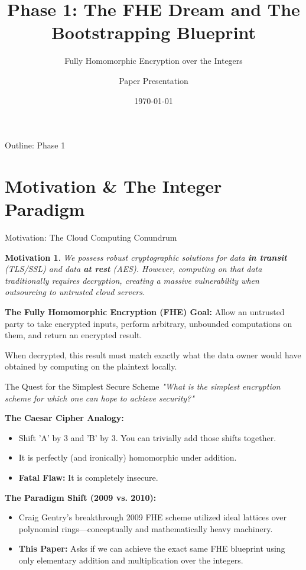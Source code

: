 \documentclass[10pt, aspectratio=169]{beamer}
\title[Phase 1: FHE \& Bootstrapping]{Phase 1: The FHE Dream and The Bootstrapping Blueprint}
\subtitle{Fully Homomorphic Encryption over the Integers}
\author{Paper Presentation}
\date{\today}
\newtheorem{motivation}{Motivation}
\begin{document}
\frame{\titlepage}

\begin{frame}{Outline: Phase 1}
    \tableofcontents
\end{frame}

\section{Motivation \& The Integer Paradigm}

\begin{frame}{Motivation: The Cloud Computing Conundrum}
    \begin{motivation}
    We possess robust cryptographic solutions for data \textbf{in transit} (TLS/SSL) and data \textbf{at rest} (AES). However, computing on that data traditionally requires decryption, creating a massive vulnerability when outsourcing to untrusted cloud servers.
    \end{motivation}
    \pause
    
    \vspace{0.3cm}
    \textbf{The Fully Homomorphic Encryption (FHE) Goal:}
    Allow an untrusted party to take encrypted inputs, perform arbitrary, unbounded computations on them, and return an encrypted result. 
    \pause
    
    \vspace{0.3cm}
    When decrypted, this result must match exactly what the data owner would have obtained by computing on the plaintext locally.
\end{frame}

\begin{frame}{The Quest for the Simplest Secure Scheme}
    \textit{"What is the simplest encryption scheme for which one can hope to achieve security?"}
    \pause
    
    \vspace{0.3cm}
    \textbf{The Caesar Cipher Analogy:}
    \begin{itemize}
        \item Shift 'A' by 3 and 'B' by 3. You can trivially add those shifts together.
        \item It is perfectly (and ironically) homomorphic under addition. 
        \item \textbf{Fatal Flaw:} It is completely insecure.
    \end{itemize}
    \pause

    \vspace{0.3cm}
    \textbf{The Paradigm Shift (2009 vs. 2010):}
    \begin{itemize}
        \item Craig Gentry's breakthrough 2009 FHE scheme utilized ideal lattices over polynomial rings—conceptually and mathematically heavy machinery.
        \pause
        \item \textbf{This Paper:} Asks if we can achieve the exact same FHE blueprint using only elementary addition and multiplication over the integers. 
    \end{itemize}
\end{frame}
\end{document}
